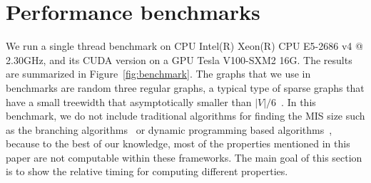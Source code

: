 \documentclass[onefignum, onetabnum]{siamart190516}
\newcommand{\<}{\langle}
\renewcommand{\>}{\rangle}
\begin{document}
\section{Performance benchmarks}\label{sec:benchmark}
We run a single thread benchmark on CPU Intel(R) Xeon(R) CPU E5-2686 v4 @ 2.30GHz,
and its CUDA version on a GPU Tesla V100-SXM2 16G.
The results are summarized in Figure~\ref{fig:benchmark}.
The graphs that we use in benchmarks are random three regular graphs,
 a typical type of sparse graphs that have a small treewidth that asymptotically smaller than $|V|/6$~\cite{Fomin2006}.
In this benchmark, we do not include traditional algorithms for finding the MIS size such as the branching algorithms~\cite{Tarjan1977, Robson1986} or dynamic programming based algorithms~\cite{Courcelle1990, Fomin2013},
because to the best of our knowledge, most of the properties mentioned in this paper are not computable within these frameworks.
The main goal of this section is to show the relative timing for computing different properties.
\end{document}
